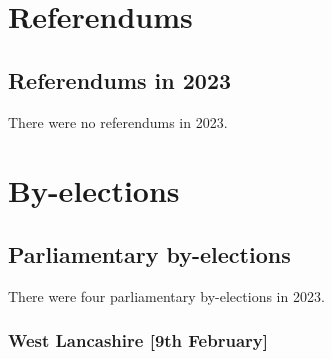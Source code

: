 \documentclass[a4paper,openany]{book}
\begin{document}



\part{Referendums}

\chapter{Referendums in 2023}

There were no referendums in 2023.




\part{By-elections}

\chapter{Parliamentary by-elections}

There were four parliamentary by-elections in 2023.

%
%
%
%
%
%
%
%
%
%

\section*{West Lancashire \hspace*{\fill}\nolinebreak[1]%
	\enspace\hspace*{\fill}
	[9th February]}
\end{document}
